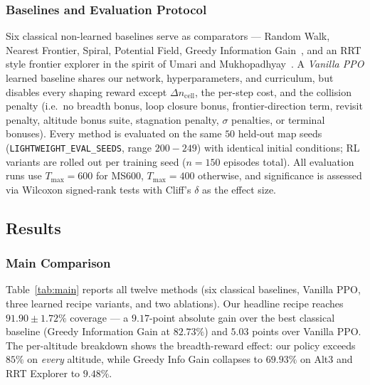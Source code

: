 \documentclass[conference]{IEEEtran}
\begin{document}
\subsubsection{Baselines and Evaluation Protocol}
Six classical non-learned baselines serve as comparators --- Random Walk, Nearest Frontier, Spiral, Potential Field, Greedy Information Gain~\cite{placed2023survey}, and an RRT style frontier explorer in the spirit of Umari and Mukhopadhyay~\cite{placed2023survey}. A \emph{Vanilla PPO} learned baseline shares our network, hyperparameters, and curriculum, but disables every shaping reward except $\Delta n_{\text{cell}}$, the per-step cost, and the collision penalty (i.e.\ no breadth bonus, loop closure bonus, frontier-direction term, revisit penalty, altitude bonus suite, stagnation penalty, $\sigma$ penalties, or terminal bonuses). Every method is evaluated on the same $50$ held-out map seeds (\texttt{LIGHTWEIGHT\_EVAL\_SEEDS}, range $200{-}249$) with identical initial conditions; RL variants are rolled out per training seed ($n\!=\!150$ episodes total). All evaluation runs use $T_{\max}\!=\!600$ for MS600, $T_{\max}\!=\!400$ otherwise, and significance is assessed via Wilcoxon signed-rank tests with Cliff's $\delta$ as the effect size.

\subsection{Results}\label{sec:results}

\subsubsection{Main Comparison}
Table~\ref{tab:main} reports all twelve methods (six classical baselines, Vanilla PPO, three learned recipe variants, and two ablations). Our headline recipe reaches $91.90\!\pm\!1.72\%$ coverage --- a $9.17$-point absolute gain over the best classical baseline (Greedy Information Gain at $82.73\%$) and $5.03$ points over Vanilla PPO. The per-altitude breakdown shows the breadth-reward effect: our policy exceeds $85\%$ on \emph{every} altitude, while Greedy Info Gain collapses to $69.93\%$ on Alt3 and RRT Explorer to $9.48\%$.
\end{document}
